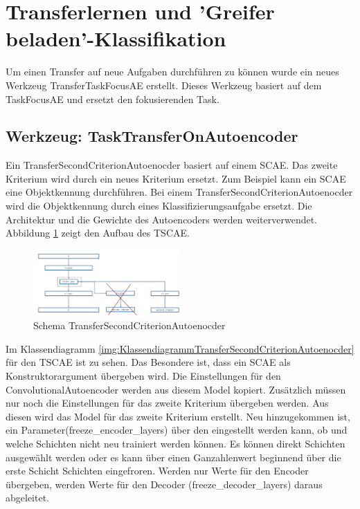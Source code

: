	\section{Transferlernen und 'Greifer beladen'-Klassifikation}
	\label{sec:TLGrappleLoaded}
	Um einen Transfer auf neue Aufgaben durchführen zu können wurde ein neues Werkzeug TransferTaskFocusAE erstellt. Dieses Werkzeug basiert auf dem TaskFocusAE und ersetzt den fokusierenden Task.
	\subsection{Werkzeug: TaskTransferOnAutoencoder}
	\label{sec:TransferSecondCriterionAutoenocder}		
	Ein TransferSecondCriterionAutoenocder basiert auf einem SCAE. Das zweite Kriterium wird durch ein neues Kriterium ersetzt. Zum Beispiel kann ein SCAE eine Objektkennung durchführen. Bei einem TransferSecondCriterionAutoenocder wird die Objektkennung durch eines Klassifizierungsaufgabe ersetzt. Die Architektur und die Gewichte des Autoencoders werden weiterverwendet. Abbildung \ref{img:SchemaTSCAE} zeigt den Aufbau des TSCAE.
	\begin{figure}[h]
		\centering
		\includegraphics[width=0.5\textwidth, center]{bilder/Schema_Autoencoders/Schema_TSCAE.png}
		\caption[Schema TransferSecondCriterionAutoenocder]{Schema TransferSecondCriterionAutoenocder}
		\label{img:SchemaTSCAE}
	\end{figure}  
	Im Klassendiagramm \ref{img:KlassendiagrammTransferSecondCriterionAutoenocder} für den TSCAE ist zu sehen. Das Besondere ist, dass ein SCAE als Konstruktorargument übergeben wird. Die Einstellungen für den ConvolutionalAutoencoder werden aus diesem Model kopiert. Zusätzlich müssen nur noch die Einstellungen für das zweite Kriterium übergeben werden. Aus diesen wird das Model für das zweite Kriterium erstellt.
	Neu hinzugekommen ist, ein Parameter(freeze\_encoder\_layers) über den eingestellt werden kann, ob und welche Schichten nicht neu trainiert werden können. Es können direkt Schichten ausgewählt werden oder es kann über einen Ganzahlenwert beginnend über die erste Schicht Schichten eingefroren. Werden nur Werte für den Encoder übergeben, werden Werte für den Decoder (freeze\_decoder\_layers) daraus abgeleitet. 
